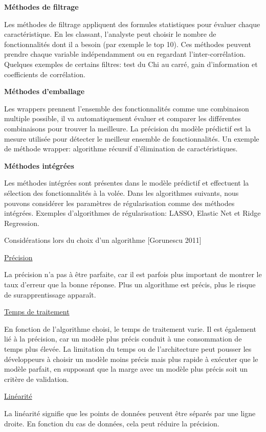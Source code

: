 \documentclass[12pt]{article}
\begin{document}
{\textbf{Méthodes de filtrage}

Les méthodes de filtrage appliquent des formules statistiques pour évaluer chaque caractéristique. En les classant, l'analyste peut choisir le nombre de fonctionnalités dont il a besoin (par exemple le top 10). Ces méthodes peuvent prendre chaque variable indépendamment ou en regardant l'inter-corrélation.
Quelques exemples de certains filtres: test du Chi au carré, gain d'information et coefficients de corrélation.

\textbf{Méthodes d'emballage}

Les wrappers prennent l'ensemble des fonctionnalités comme une combinaison multiple possible, il va automatiquement évaluer et comparer les différentes combinaisons pour trouver la meilleure. La précision du modèle prédictif est la mesure utilisée pour détecter le meilleur ensemble de fonctionnalités.
Un exemple de méthode wrapper: algorithme récursif d'élimination de caractéristiques.

\textbf{Méthodes intégrées}

Les méthodes intégrées sont présentes dans le modèle prédictif et effectuent la sélection des fonctionnalités à la volée. Dans les algorithmes suivants, nous pouvons considérer les paramètres de régularisation comme des méthodes intégrées.
Exemples d'algorithmes de régularisation: LASSO, Elastic Net et Ridge Regression.

Considérations lors du choix d'un algorithme {\color{red}[Gorunescu 2011]}

\underline{Précision}

La précision n'a pas à être parfaite, car il est parfois plus important de montrer le taux d'erreur que la bonne réponse. Plus un algorithme est précis, plus le risque de surapprentissage apparaît.


\underline{Temps de traitement}

En fonction de l'algorithme choisi, le temps de traitement varie. Il est également lié à la précision, car un modèle plus précis conduit à une consommation de temps plus élevée. La limitation du temps ou de l'architecture peut pousser les développeurs à choisir un modèle moins précis mais plus rapide à exécuter que le modèle parfait, en supposant que la marge avec un modèle plus précis soit un critère de validation.

\underline{Linéarité}

La linéarité signifie que les points de données peuvent être séparés par une ligne droite. En fonction du cas de données, cela peut réduire la précision.


}
\end{document}
